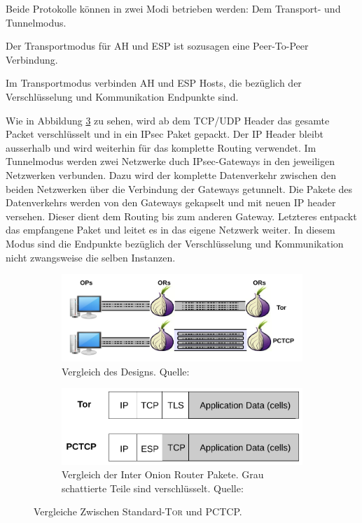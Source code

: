 \documentclass[fleqn,envcountsame,runningheads,10pt,a4paper]{llncs}
\begin{document}
Beide Protokolle können in zwei Modi betrieben werden: Dem Transport- und Tunnelmodus.

Der Transportmodus für AH und ESP ist sozusagen eine Peer-To-Peer Verbindung.

Im Transportmodus verbinden AH und ESP Hosts, die bezüglich der Verschlüsselung und Kommunikation Endpunkte sind.

Wie in Abbildung \ref{fig:pctcpheader} zu sehen, wird ab dem TCP/UDP Header das gesamte Packet verschlüsselt und in ein IPsec Paket gepackt.
Der IP Header bleibt ausserhalb und wird weiterhin für das komplette Routing verwendet. Im Tunnelmodus werden zwei Netzwerke duch IPsec-Gateways in den jeweiligen Netzwerken verbunden.
Dazu wird der komplette Datenverkehr zwischen den beiden Netzwerken über die Verbindung der Gateways getunnelt.
Die Pakete des Datenverkehrs werden von den Gateways gekapselt und mit neuen IP header versehen. Dieser dient dem Routing bis zum anderen Gateway.
Letzteres entpackt das empfangene Paket und leitet es in das eigene Netzwerk weiter. In diesem Modus sind die Endpunkte bezüglich der Verschlüsselung und Kommunikation nicht zwangsweise die selben Instanzen.

\begin{figure}[b]
  \centering
  \begin{subfigure}[t]{0.46\textwidth}
    \includegraphics[width=\textwidth]{pics/PCTCP_design.pdf}
    \caption{Vergleich des Designs. Quelle: \cite{pctcp}}
    \label{fig:pctcpdesign}
  \end{subfigure}
  \begin{subfigure}[t]{0.46\textwidth}
    \includegraphics[width=\textwidth]{pics/PCTCP_header.pdf}
    \caption{Vergleich der Inter Onion Router Pakete. Grau schattierte Teile sind verschlüsselt. Quelle:\cite{pctcp}}
    \label{fig:pctcpheader}
  \end{subfigure}
  \caption{Vergleiche Zwischen Standard-\textsc{Tor} und PCTCP.}
\end{figure}
\end{document}
